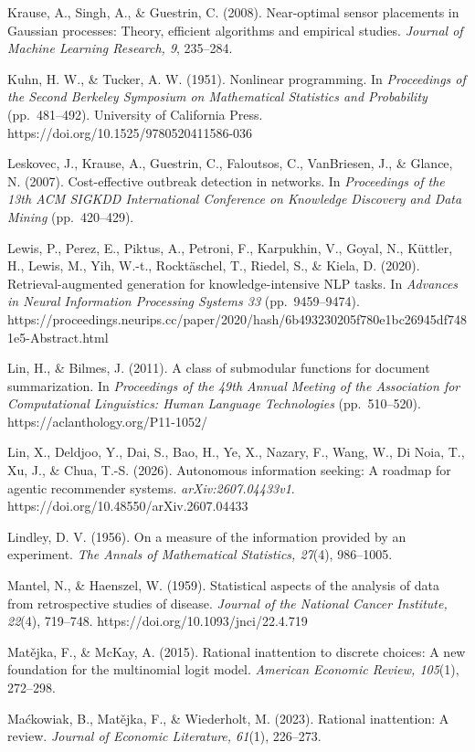 \documentclass[
  11pt]{article}
\begin{document}
Krause, A., Singh, A., \& Guestrin, C. (2008). Near-optimal sensor
placements in Gaussian processes: Theory, efficient algorithms and
empirical studies. \emph{Journal of Machine Learning Research, 9},
235--284.

Kuhn, H. W., \& Tucker, A. W. (1951). Nonlinear programming. In
\emph{Proceedings of the Second Berkeley Symposium on Mathematical
Statistics and Probability} (pp.~481--492). University of California
Press. https://doi.org/10.1525/9780520411586-036

Leskovec, J., Krause, A., Guestrin, C., Faloutsos, C., VanBriesen, J.,
\& Glance, N. (2007). Cost-effective outbreak detection in networks. In
\emph{Proceedings of the 13th ACM SIGKDD International Conference on
Knowledge Discovery and Data Mining} (pp.~420--429).

Lewis, P., Perez, E., Piktus, A., Petroni, F., Karpukhin, V., Goyal, N.,
Küttler, H., Lewis, M., Yih, W.-t., Rocktäschel, T., Riedel, S., \&
Kiela, D. (2020). Retrieval-augmented generation for knowledge-intensive
NLP tasks. In \emph{Advances in Neural Information Processing Systems
33} (pp.~9459--9474).
https://proceedings.neurips.cc/paper/2020/hash/6b493230205f780e1bc26945df7481e5-Abstract.html

Lin, H., \& Bilmes, J. (2011). A class of submodular functions for
document summarization. In \emph{Proceedings of the 49th Annual Meeting
of the Association for Computational Linguistics: Human Language
Technologies} (pp.~510--520). https://aclanthology.org/P11-1052/

Lin, X., Deldjoo, Y., Dai, S., Bao, H., Ye, X., Nazary, F., Wang, W., Di
Noia, T., Xu, J., \& Chua, T.-S. (2026). Autonomous information seeking:
A roadmap for agentic recommender systems. \emph{arXiv:2607.04433v1}.
https://doi.org/10.48550/arXiv.2607.04433

Lindley, D. V. (1956). On a measure of the information provided by an
experiment. \emph{The Annals of Mathematical Statistics, 27}(4),
986--1005.

Mantel, N., \& Haenszel, W. (1959). Statistical aspects of the analysis
of data from retrospective studies of disease. \emph{Journal of the
National Cancer Institute, 22}(4), 719--748.
https://doi.org/10.1093/jnci/22.4.719

Matějka, F., \& McKay, A. (2015). Rational inattention to discrete
choices: A new foundation for the multinomial logit model.
\emph{American Economic Review, 105}(1), 272--298.

Maćkowiak, B., Matějka, F., \& Wiederholt, M. (2023). Rational
inattention: A review. \emph{Journal of Economic Literature, 61}(1),
226--273.
\end{document}
